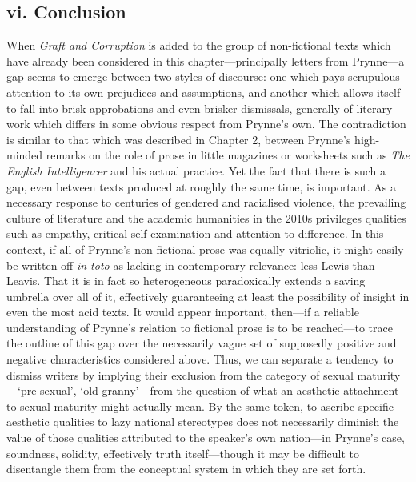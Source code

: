 \documentclass[]{article}
\begin{document}
\subsection{vi. Conclusion}\label{vi.-conclusion}

When \emph{Graft and Corruption} is added to the group of non-fictional
texts which have already been considered in this chapter—principally
letters from Prynne—a gap seems to emerge between two styles of
discourse: one which pays scrupulous attention to its own prejudices and
assumptions, and another which allows itself to fall into brisk
approbations and even brisker dismissals, generally of literary work
which differs in some obvious respect from Prynne’s own. The
contradiction is similar to that which was described in Chapter 2,
between Prynne’s high-minded remarks on the role of prose in little
magazines or worksheets such as \emph{The English Intelligencer} and his
actual practice. Yet the fact that there is such a gap, even between
texts produced at roughly the same time, is important. As a necessary
response to centuries of gendered and racialised violence, the
prevailing culture of literature and the academic humanities in the
2010s privileges qualities such as empathy, critical self-examination
and attention to difference. In this context, if all of Prynne’s
non-fictional prose was equally vitriolic, it might easily be written
off \emph{in toto} as lacking in contemporary relevance: less Lewis than
Leavis. That it is in fact so heterogeneous paradoxically extends a
saving umbrella over all of it, effectively guaranteeing at least the
possibility of insight in even the most acid texts. It would appear
important, then—if a reliable understanding of Prynne’s relation to
fictional prose is to be reached—to trace the outline of this gap over
the necessarily vague set of supposedly positive and negative
characteristics considered above. Thus, we can separate a tendency to
dismiss writers by implying their exclusion from the category of sexual
maturity—‘pre-sexual’, ‘old granny’—from the question of what an
aesthetic attachment to sexual maturity might actually mean. By the same
token, to ascribe specific aesthetic qualities to lazy national
stereotypes does not necessarily diminish the value of those qualities
attributed to the speaker’s own nation—in Prynne’s case, soundness,
solidity, effectively truth itself—though it may be difficult to
disentangle them from the conceptual system in which they are set forth.
\end{document}
